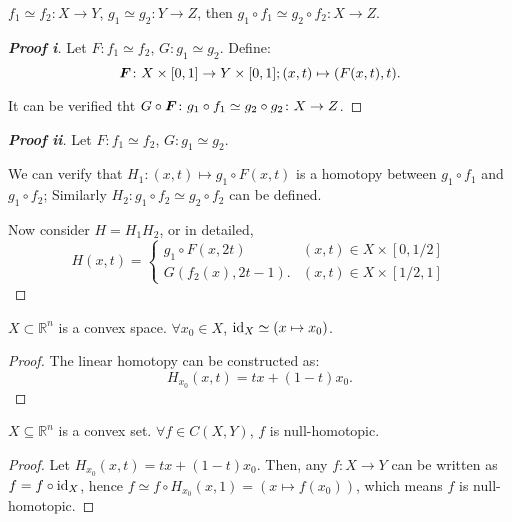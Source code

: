 \documentclass[openany, oneside, a5paper]{book}
\begin{document}
\begin{theorem}%
    \label{theorem: Composition of homotopies}
    $f_1 \simeq f_2 \colon X \to Y$, $g_1 \simeq g_2 \colon Y \to Z$, then $g_1 \circ f_1 \simeq g_2 \circ f_2 \colon X \to Z$.
\end{theorem}
\begin{proof}[\textbf{Proof i}]
    Let $F \colon f_1 \simeq f_2$, $G \colon g_1 \simeq g_2$. 
    Define:
    \begin{equation*}
        \boldsymbol{F} \colon X \times [0, 1] \to Y \times [0, 1]; 
        (x, t) \mapsto (F(x, t), t). 
    \end{equation*}

    It can be verified tht $G \circ \boldsymbol{F} \colon g_1 \circ f_1 \simeq g_2 \circ g_2 \colon X \to Z$.
\end{proof}
\begin{proof}[\textbf{Proof ii}]
    Let $F \colon f_1 \simeq f_2$, $G \colon g_1 \simeq g_2$. 

    We can verify that $H_1 \colon (x, t) \mapsto g_1 \circ F(x, t)$ is a homotopy between $g_1 \circ f_1$ and $g_1 \circ f_2$;
    Similarly $H_2 \colon g_1 \circ f_2 \simeq g_2 \circ f_2$ can be defined.

    Now consider $H = H_1 H_2$, or in detailed,
    \begin{equation*}
        H(x, t) = \begin{cases}
            g_1 \circ F(x, 2t) & (x, t) \in X \times [0, 1/2] \\
            G(f_2(x), 2t - 1). & (x, t) \in X \times [1/2, 1]
        \end{cases}
    \end{equation*}
\end{proof}

\begin{lemma}
    $X \subset \mathbb R^n$ is a convex space.
    $\forall x_0 \in X$,
    $\operatorname{id}_X \simeq (x \mapsto x_0)$.
\end{lemma}
\begin{proof}
    The linear homotopy can be constructed as:
    \begin{equation*}
        H_{x_0} (x, t) = tx + (1 - t) x_0.
    \end{equation*}
\end{proof}

\begin{theorem}%
    \label{theorem: Continuous mappings from a convex set are null-homotopic}
    $X \subseteq \mathbb R^n$ is a convex set.
    $\forall f \in C(X, Y)$, $f$ is null-homotopic.
\end{theorem}
\begin{proof}
    Let $H_{x_0} (x, t) = tx + (1 - t) x_0$.
    Then, any $f \colon X \to Y$ can be written as $f = f \circ \operatorname{id}_X$, hence $f \simeq f \circ H_{x_0}(x, 1) = (x \mapsto f(x_0))$, which means $f$ is null-homotopic.
\end{proof}
\end{document}
